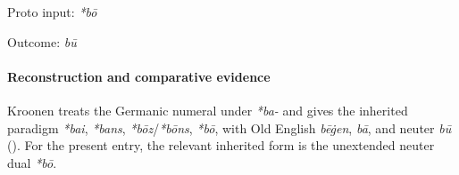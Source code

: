 \documentclass[
  british,
  a4paper,
]{article}
\begin{document}
Proto input: \emph{*bō}

\begingroup
\setlength{\fboxsep}{6pt}

\noindent{} \endgroup

Outcome: \emph{bū}

\paragraph{Reconstruction and comparative
evidence}\label{reconstruction-and-comparative-evidence-3}

Kroonen treats the Germanic numeral under \emph{*ba-} and gives the
inherited paradigm \emph{*bai}, \emph{*bans}, \emph{*bōz}/\emph{*bōns},
\emph{*bō}, with Old English \emph{bēġen}, \emph{bā}, and neuter
\emph{bū} (). For the
present entry, the relevant inherited form is the unextended neuter dual
\emph{*bō}.
\end{document}
